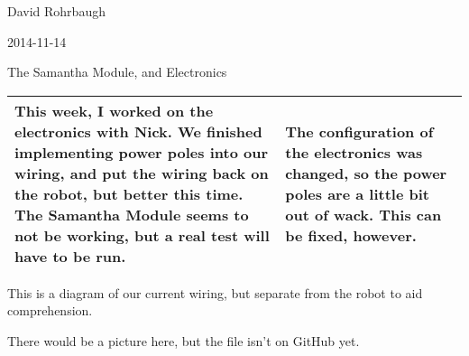 David Rohrbaugh

2014-11-14

The Samantha Module, and Electronics

\begin{tabular}{|p{5cm}|p{5cm}|}
 \hline
 This week, I worked on the electronics with Nick. We finished implementing power poles into our wiring, and put the wiring back on the robot, but better this time. The Samantha Module seems to not be working, but a real test will have to be run.
 &
 The configuration of the electronics was changed, so the power poles are a little bit out of wack. This can be fixed, however.
 \\
 \hline
\end{tabular}

\medskip

This is a diagram of our current wiring, but separate from the robot to aid comprehension.

\medskip

There would be a picture here, but the file isn't on GitHub yet.

\begin{center}
\end{center}
